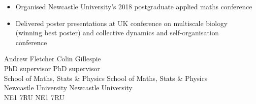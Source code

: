 \documentclass[12pt, a4paper]{article}
\begin{document}

\begin{itemize}[align=left,                                                             
                leftmargin=2em,
                itemindent=0pt,
                labelsep=0pt,
                labelwidth=1.5em]
	\item Organised Newcastle University's 2018 postgraduate applied maths conference
	\item Delivered poster presentations at UK conference on multiscale biology (winning best poster) and collective dynamics and self-organisation conference 
\end{itemize}

\vspace{2mm}
Andrew Fletcher \hfill Colin Gillespie \\
PhD supervisor \hfill PhD supervisor \\
School of Maths, Stats \& Physics \hfill School of Maths, Stats \& Physics \\
Newcastle University \hfill Newcastle University \\
NE1 7RU \hfill NE1 7RU
\end{document}
